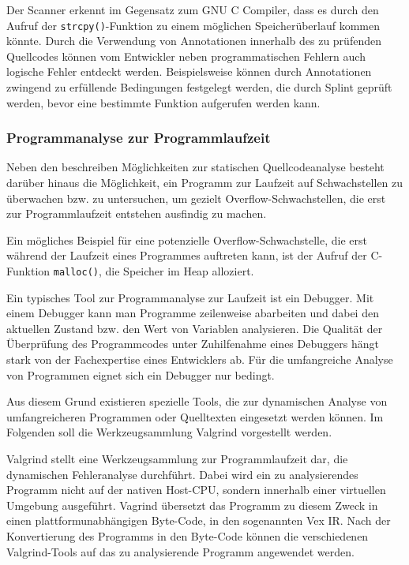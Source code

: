 Der Scanner erkennt im Gegensatz zum GNU C Compiler, dass es durch den 
Aufruf der \texttt{strcpy()}-Funktion zu einem möglichen Speicherüberlauf 
kommen könnte. Durch die Verwendung von Annotationen innerhalb des zu 
prüfenden Quellcodes können vom Entwickler neben programmatischen Fehlern 
auch logische Fehler entdeckt werden. Beispielsweise können durch  
Annotationen zwingend zu erfüllende Bedingungen festgelegt werden, 
die durch Splint geprüft werden, bevor eine bestimmte Funktion aufgerufen 
werden kann.

\subsubsection{Programmanalyse zur Programmlaufzeit}

Neben den beschreiben Möglichkeiten zur statischen Quellcodeanalyse 
besteht darüber hinaus die Möglichkeit, ein Programm zur Laufzeit auf 
Schwachstellen zu überwachen bzw. zu untersuchen, um gezielt 
Overflow-Schwachstellen, die erst zur Programmlaufzeit entstehen 
ausfindig zu machen.

Ein mögliches Beispiel für eine potenzielle Overflow-Schwachstelle, die 
erst während der Laufzeit eines Programmes auftreten kann, ist der 
Aufruf der C-Funktion \texttt{malloc()}, die Speicher im Heap alloziert.

Ein typisches Tool zur Programmanalyse zur Laufzeit ist ein Debugger. 
Mit einem Debugger kann man Programme zeilenweise abarbeiten und dabei 
den aktuellen Zustand bzw. den Wert von Variablen analysieren. Die Qualität 
der Überprüfung des Programmcodes unter Zuhilfenahme eines Debuggers 
hängt stark von der Fachexpertise eines Entwicklers ab. Für die umfangreiche 
Analyse von Programmen eignet sich ein Debugger nur bedingt.

Aus diesem Grund existieren spezielle Tools, die zur dynamischen Analyse 
von umfangreicheren Programmen oder Quelltexten eingesetzt werden können. 
Im Folgenden soll die Werkzeugsammlung Valgrind vorgestellt werden.


Valgrind stellt eine Werkzeugsammlung zur Programmlaufzeit dar, die 
dynamischen Fehleranalyse durchführt. Dabei wird ein zu analysierendes 
Programm nicht auf der nativen Host-CPU, sondern innerhalb einer 
virtuellen Umgebung ausgeführt.
Vagrind übersetzt das Programm zu diesem Zweck in einen 
plattformunabhängigen Byte-Code, in den sogenannten Vex IR. Nach der 
Konvertierung des Programms in den Byte-Code können die verschiedenen 
Valgrind-Tools auf das zu analysierende Programm angewendet werden.

